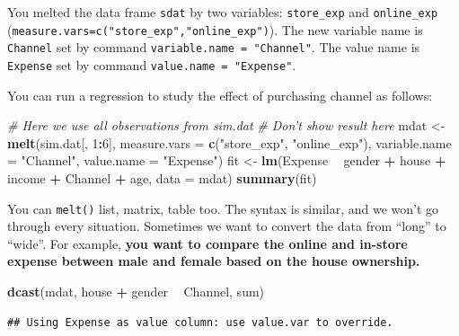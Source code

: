 \documentclass[12pt,]{krantz}
\makeatletter
\newenvironment{Shaded}{\begin{snugshade}}{\end{snugshade}}
\newcommand{\CommentTok}[1]{\textcolor[rgb]{0.37,0.37,0.37}{\textit{#1}}}
\newcommand{\DataTypeTok}[1]{\textcolor[rgb]{0.27,0.27,0.27}{#1}}
\newcommand{\DecValTok}[1]{\textcolor[rgb]{0.06,0.06,0.06}{#1}}
\newcommand{\KeywordTok}[1]{\textcolor[rgb]{0.27,0.27,0.27}{\textbf{#1}}}
\newcommand{\NormalTok}[1]{#1}
\newcommand{\OperatorTok}[1]{\textcolor[rgb]{0.43,0.43,0.43}{\textbf{#1}}}
\newcommand{\StringTok}[1]{\textcolor[rgb]{0.5,0.5,0.5}{#1}}
\newenvironment{kframe}{%
\medskip{}
\setlength{\fboxsep}{.8em}
 \def\at@end@of@kframe{}%
 \ifinner\ifhmode%
  \def\at@end@of@kframe{\end{minipage}}%
  \begin{minipage}{\columnwidth}%
 \fi\fi%
 \def\FrameCommand##1{\hskip\@totalleftmargin \hskip-\fboxsep
 \colorbox{shadecolor}{##1}\hskip-\fboxsep
     \hskip-\linewidth \hskip-\@totalleftmargin \hskip\columnwidth}%
 \MakeFramed {\advance\hsize-\width
   \@totalleftmargin\z@ \linewidth\hsize
   \@setminipage}}%
 {\par\unskip\endMakeFramed%
 \at@end@of@kframe}
\renewenvironment{Shaded}{\begin{kframe}}{\end{kframe}}
\makeatother
\begin{document}
You melted the data frame \texttt{sdat} by two variables: \texttt{store\_exp} and \texttt{online\_exp} (\texttt{measure.vars=c("store\_exp","online\_exp")}). The new variable name is \texttt{Channel} set by command \texttt{variable.name\ =\ "Channel"}. The value name is \texttt{Expense} set by command \texttt{value.name\ =\ "Expense"}.

You can run a regression to study the effect of purchasing channel as follows:

\begin{Shaded}
\begin{Highlighting}[]
\CommentTok{# Here we use all observations from sim.dat}
\CommentTok{# Don't show result here}
\NormalTok{mdat <-}\StringTok{ }\KeywordTok{melt}\NormalTok{(sim.dat[, }\DecValTok{1}\OperatorTok{:}\DecValTok{6}\NormalTok{], }
             \DataTypeTok{measure.vars =} \KeywordTok{c}\NormalTok{(}\StringTok{"store_exp"}\NormalTok{, }\StringTok{"online_exp"}\NormalTok{), }
             \DataTypeTok{variable.name =} \StringTok{"Channel"}\NormalTok{, }
             \DataTypeTok{value.name =} \StringTok{"Expense"}\NormalTok{)}
\NormalTok{fit <-}\StringTok{ }\KeywordTok{lm}\NormalTok{(Expense }\OperatorTok{~}\StringTok{ }\NormalTok{gender }\OperatorTok{+}\StringTok{ }\NormalTok{house }\OperatorTok{+}\StringTok{ }\NormalTok{income }\OperatorTok{+}\StringTok{ }\NormalTok{Channel }\OperatorTok{+}\StringTok{ }\NormalTok{age, }
          \DataTypeTok{data =}\NormalTok{ mdat)}
\KeywordTok{summary}\NormalTok{(fit)}
\end{Highlighting}
\end{Shaded}

You can \texttt{melt()} list, matrix, table too. The syntax is similar, and we won't go through every situation. Sometimes we want to convert the data from ``long'' to ``wide''. For example, \textbf{you want to compare the online and in-store expense between male and female based on the house ownership. }

\begin{Shaded}
\begin{Highlighting}[]
\KeywordTok{dcast}\NormalTok{(mdat, house }\OperatorTok{+}\StringTok{ }\NormalTok{gender }\OperatorTok{~}\StringTok{ }\NormalTok{Channel, sum)}
\end{Highlighting}
\end{Shaded}

\begin{verbatim}
## Using Expense as value column: use value.var to override.
\end{verbatim}
\end{document}
